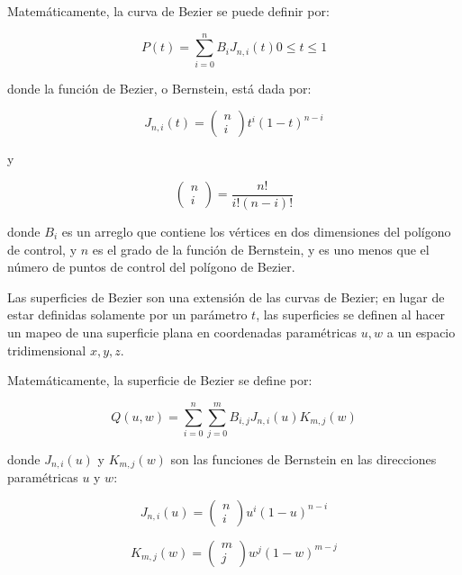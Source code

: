 Matemáticamente, la curva de Bezier se puede definir por:

\begin{equation}
	P(t) = \sum_{i=0}^n B_i J_{n,i}(t) 0 \leq t \leq 1
\end{equation}

donde la función de Bezier, o Bernstein, está dada por:

\begin{equation}
	J_{n,i}(t) = \left(
    \begin{array}{c}
      n \\
      i
    \end{array}
  \right) t^i(1-t)^{n-i}
\end{equation}

y

\begin{equation}
  \left(
    \begin{array}{c}
      n \\
      i
    \end{array}
  \right) =  \frac{n!}{i!(n-i)!}
\end{equation}

donde $B_i$ es un arreglo que contiene los vértices en dos dimensiones del polígono de control, y $n$ es el grado de la función de Bernstein, y es uno menos que el número de puntos de control del polígono de Bezier.

Las superficies de Bezier son una extensión de las curvas de Bezier; en lugar de estar definidas solamente por un parámetro $t$, las superficies se definen al hacer un mapeo de una superficie plana en coordenadas paramétricas $u, w$ a un espacio tridimensional $x,y,z$. 

Matemáticamente, la superficie de Bezier se define por:

\begin{equation}
	Q(u,w) = \sum_{i=0}^n \sum_{j=0}^m B_{i,j} J_{n,i}(u) K_{m,j}(w)
\end{equation}

donde $J_{n,i}(u)$ y $K_{m,j}(w)$ son las funciones de Bernstein en las direcciones paramétricas $u$ y $w$:

\begin{equation}
	J_{n,i}(u) = \left(
    \begin{array}{c}
      n \\
      i
    \end{array}
  \right) u^i(1-u)^{n-i}
\end{equation}

\begin{equation}
	K_{m,j}(w) = \left(
    \begin{array}{c}
      m \\
      j
    \end{array}
  \right) w^j(1-w)^{m-j}
\end{equation}

